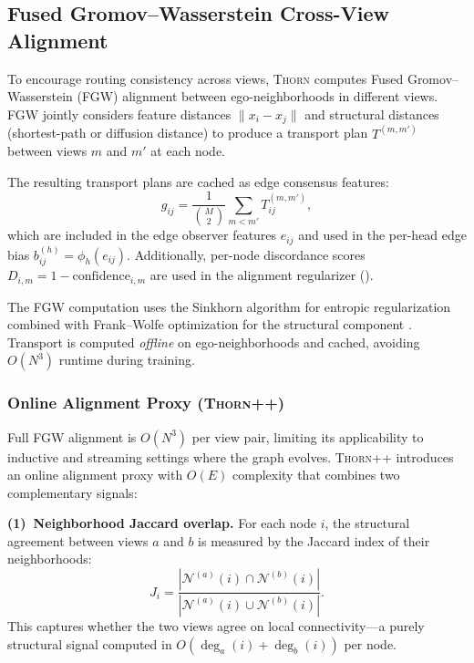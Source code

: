 \documentclass[11pt,a4paper]{article}
\newcommand{\thorn}{\textsc{Thorn}}
\newcommand{\thornpp}{\textsc{Thorn++}}
\newcommand{\calN}{\mathcal{N}}
\begin{document}
\subsection{Fused Gromov--Wasserstein Cross-View Alignment}
\label{sec:fgw}

To encourage routing consistency across views, \thorn{} computes
Fused Gromov--Wasserstein (FGW) \citep{vayer2019optimal} alignment
between ego-neighborhoods in different views.
FGW jointly considers feature distances
$\|x_i - x_j\|$ and structural distances (shortest-path or diffusion
distance) to produce a transport plan $T^{(m, m')}$ between views
$m$ and $m'$ at each node.

The resulting transport plans are cached as edge consensus features:
\begin{equation}
  g_{ij} = \frac{1}{\binom{M}{2}} \sum_{m < m'} T_{ij}^{(m,m')},
\end{equation}
which are included in the edge observer features $e_{ij}$ and used
in the per-head edge bias $b_{ij}^{(h)} = \phi_h(e_{ij})$.
Additionally, per-node discordance scores
$D_{i,m} = 1 - \text{confidence}_{i,m}$ are used in the alignment
regularizer ().

The FGW computation uses the Sinkhorn algorithm for entropic
regularization combined with Frank--Wolfe optimization for the
structural component \citep{peyre2019computational}.
Transport is computed \emph{offline} on ego-neighborhoods
and cached, avoiding $O(N^3)$ runtime during training.

\subsubsection{Online Alignment Proxy (\thornpp{})}
\label{sec:online_proxy}

Full FGW alignment is $O(N^3)$ per view pair, limiting its
applicability to inductive and streaming settings where the graph
evolves.
\thornpp{} introduces an online alignment proxy with $O(E)$ complexity
\citep{scetbon2022linear} that combines two complementary signals:

\textbf{(1)~Neighborhood Jaccard overlap.}
For each node $i$, the structural agreement between views $a$ and $b$
is measured by the Jaccard index of their neighborhoods:
\begin{equation}
  \label{eq:jaccard}
  J_i = \frac{|\calN^{(a)}(i) \cap \calN^{(b)}(i)|}
    {|\calN^{(a)}(i) \cup \calN^{(b)}(i)|}.
\end{equation}
This captures whether the two views agree on local connectivity---a
purely structural signal computed in $O(\deg_a(i) + \deg_b(i))$ per node.
\end{document}
